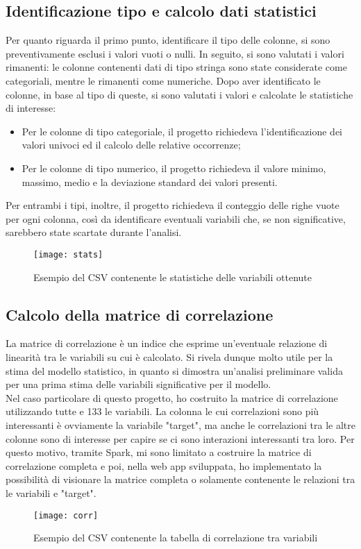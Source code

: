 \subsection{Identificazione tipo e calcolo dati statistici}
Per quanto riguarda il primo punto, identificare il tipo delle colonne, si sono preventivamente esclusi i valori vuoti o nulli.
In seguito, si sono valutati i valori rimanenti: le colonne contenenti dati di tipo stringa sono state considerate come categoriali, mentre le rimanenti come numeriche. 
Dopo aver identificato le colonne, in base al tipo di queste, si sono valutati i valori e calcolate le statistiche di interesse:
\begin{itemize}
	\item Per le colonne di tipo categoriale, il progetto richiedeva l'identificazione dei valori univoci ed il calcolo delle relative occorrenze;
	\item Per le colonne di tipo numerico, il progetto richiedeva il valore minimo, massimo, medio e la deviazione standard dei valori presenti.
\end{itemize}
Per entrambi i tipi, inoltre, il progetto richiedeva il conteggio delle righe vuote per ogni colonna, così da identificare eventuali variabili che, se non significative, sarebbero state scartate durante l'analisi.
\clearpage
\begin{figure}[!h]
	\centering
	\texttt{[image: stats]}
	\caption{Esempio del CSV contenente le statistiche delle variabili ottenute}
\end{figure}

\subsection{Calcolo della matrice di correlazione}
La matrice di correlazione è un indice che esprime un'eventuale relazione di linearità tra le variabili su cui è calcolato. Si rivela dunque molto utile per la stima del modello statistico, in quanto si dimostra un'analisi preliminare valida per una prima stima delle variabili significative per il modello.\\
Nel caso particolare di questo progetto, ho costruito la matrice di correlazione utilizzando tutte e 133 le variabili. La colonna le cui correlazioni sono più interessanti è ovviamente la variabile "target", ma anche le correlazioni tra le altre colonne sono di interesse per capire se ci sono interazioni interessanti tra loro. Per questo motivo, tramite Spark, mi sono limitato a costruire la matrice di correlazione completa e poi, nella \gls{web app} sviluppata, ho implementato la possibilità di visionare la matrice completa o solamente contenente le relazioni tra le variabili e "target".
\begin{figure}[!h]
	\centering
	\texttt{[image: corr]}
	\caption{Esempio del CSV contenente la tabella di correlazione tra variabili}
\end{figure}


